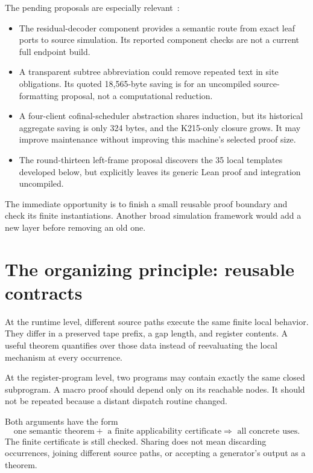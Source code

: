 \documentclass[11pt,letterpaper]{article}
\theoremstyle{definition}\newtheorem{definition}[theorem]{Definition}
\begin{document}
The pending proposals are especially relevant~\cite{intake215,leftframe}:
\begin{itemize}
\item The residual-decoder component provides a semantic route from exact leaf ports to source simulation. Its reported component checks are not a current full endpoint build.
\item A transparent subtree abbreviation could remove repeated text in site obligations. Its quoted 18,565-byte saving is for an uncompiled source-formatting proposal, not a computational reduction.
\item A four-client cofinal-scheduler abstraction shares induction, but its historical aggregate saving is only 324 bytes, and the K215-only closure grows. It may improve maintenance without improving this machine's selected proof size.
\item The round-thirteen left-frame proposal discovers the 35 local templates developed below, but explicitly leaves its generic Lean proof and integration uncompiled.
\end{itemize}
The immediate opportunity is to finish a small reusable proof boundary and check its finite instantiations. Another broad simulation framework would add a new layer before removing an old one.

\section{The organizing principle: reusable contracts}
At the runtime level, different source paths execute the same finite local behavior. They differ in a preserved tape prefix, a gap length, and register contents. A useful theorem quantifies over those data instead of reevaluating the local mechanism at every occurrence.

At the register-program level, two programs may contain exactly the same closed subprogram. A macro proof should depend only on its reachable nodes. It should not be repeated because a distant dispatch routine changed.

Both arguments have the form
\[
 \text{one semantic theorem}
 +\text{ a finite applicability certificate}
 \Longrightarrow \text{ all concrete uses}.
\]
The finite certificate is still checked. Sharing does not mean discarding occurrences, joining different source paths, or accepting a generator's output as a theorem.
\end{document}
